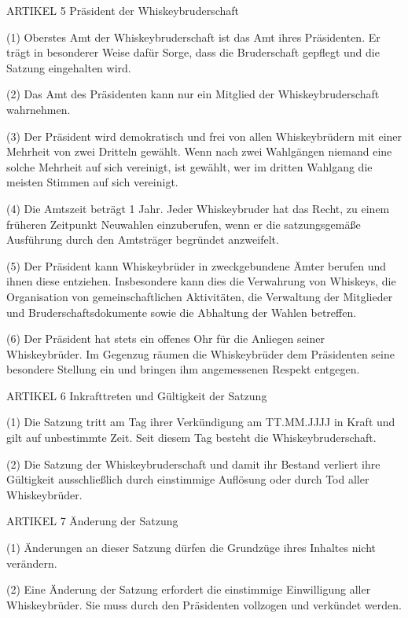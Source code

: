     
    ARTIKEL 5
    Präsident der Whiskeybruderschaft

(1) Oberstes Amt der Whiskeybruderschaft ist das Amt ihres Präsidenten. Er trägt in besonderer Weise dafür Sorge, dass die Bruderschaft gepflegt und die Satzung eingehalten wird.

(2) Das Amt des Präsidenten kann nur ein Mitglied der Whiskeybruderschaft wahrnehmen.

(3) Der Präsident wird demokratisch und frei von allen Whiskeybrüdern mit einer Mehrheit von zwei Dritteln gewählt. Wenn nach zwei Wahlgängen niemand eine solche Mehrheit auf sich vereinigt, ist gewählt, wer im dritten Wahlgang die meisten Stimmen auf sich vereinigt.

(4) Die Amtszeit beträgt 1 Jahr. Jeder Whiskeybruder hat das Recht, zu einem früheren Zeitpunkt Neuwahlen einzuberufen, wenn er die satzungsgemäße Ausführung durch den Amtsträger begründet anzweifelt.

(5) Der Präsident kann Whiskeybrüder in zweckgebundene Ämter berufen und ihnen diese entziehen. Insbesondere kann dies die Verwahrung von Whiskeys, die Organisation von gemeinschaftlichen Aktivitäten, die Verwaltung der Mitglieder und Bruderschaftsdokumente sowie die Abhaltung der Wahlen betreffen.

(6) Der Präsident hat stets ein offenes Ohr für die Anliegen seiner Whiskeybrüder. Im Gegenzug räumen die Whiskeybrüder dem Präsidenten seine besondere Stellung ein und bringen ihm angemessenen Respekt entgegen.



    ARTIKEL 6
    Inkrafttreten und Gültigkeit der Satzung

(1) Die Satzung tritt am Tag ihrer Verkündigung am TT.MM.JJJJ in Kraft und gilt auf unbestimmte Zeit. Seit diesem Tag besteht die Whiskeybruderschaft.

(2) Die Satzung der Whiskeybruderschaft und damit ihr Bestand verliert ihre Gültigkeit ausschließlich durch einstimmige Auflösung oder durch Tod aller Whiskeybrüder.


    
    ARTIKEL 7
    Änderung der Satzung

(1) Änderungen an dieser Satzung dürfen die Grundzüge ihres Inhaltes nicht verändern.

(2) Eine Änderung der Satzung erfordert die einstimmige Einwilligung aller Whiskeybrüder. Sie muss durch den Präsidenten vollzogen und verkündet werden.



